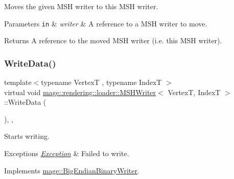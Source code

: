 Moves the given M\+SH writer to this M\+SH writer.


\begin{DoxyParams}[1]{Parameters}
\mbox{\tt in}  & {\em writer} & A reference to a M\+SH writer to move. \\
\hline
\end{DoxyParams}
\begin{DoxyReturn}{Returns}
A reference to the moved M\+SH writer (i.\+e. this M\+SH writer). 
\end{DoxyReturn}
\mbox{\label{classmage_1_1rendering_1_1loader_1_1_m_s_h_writer_ad61ee7097e1bfb52ca9a0697d2cd6a7e}} 
\subsubsection{\texorpdfstring{Write\+Data()}{WriteData()}}
{\footnotesize\ttfamily template$<$typename VertexT , typename IndexT $>$ \\
virtual void \mbox{\hyperlink{classmage_1_1rendering_1_1loader_1_1_m_s_h_writer}{mage\+::rendering\+::loader\+::\+M\+S\+H\+Writer}}$<$ VertexT, IndexT $>$\+::Write\+Data (\begin{DoxyParamCaption}{ }\end{DoxyParamCaption})\hspace{0.3cm}{\ttfamily [override]}, {\ttfamily [private]}, {\ttfamily [virtual]}}

Starts writing.


\begin{DoxyExceptions}{Exceptions}
{\em \mbox{\hyperlink{classmage_1_1_exception}{Exception}}} & Failed to write. \\
\hline
\end{DoxyExceptions}


Implements \mbox{\hyperlink{classmage_1_1_big_endian_binary_writer_a719581274b1b185ef05687183f7ded25}{mage\+::\+Big\+Endian\+Binary\+Writer}}.

\mbox{\label{classmage_1_1rendering_1_1loader_1_1_m_s_h_writer_a6ce9780687a45a6c6f98e0843190b63b}} 
